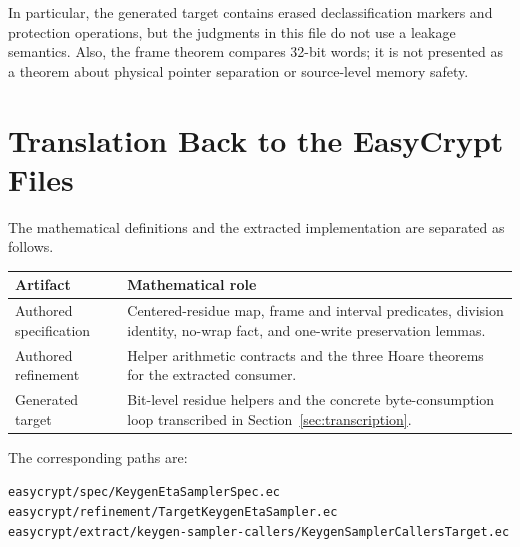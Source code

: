 \documentclass[11pt]{article}
\theoremstyle{definition}
\theoremstyle{plain}
\theoremstyle{remark}
\newcommand{\code}[1]{\nolinkurl{#1}}
\begin{document}
In particular, the generated target contains erased declassification markers
and protection operations, but the judgments in this file do not use a
leakage semantics.  Also, the frame theorem compares 32-bit words; it is not
presented as a theorem about physical pointer separation or source-level
memory safety.

\section{Translation Back to the EasyCrypt Files}

The mathematical definitions and the extracted implementation are separated
as follows.

\noindent\begin{tabularx}{\textwidth}{>{\raggedright\arraybackslash}p{}X}
\toprule
Artifact & Mathematical role \\
\midrule
Authored specification & Centered-residue map, frame and interval predicates,
division identity, no-wrap fact, and one-write preservation lemmas. \\
Authored refinement & Helper arithmetic contracts and the three Hoare theorems
for the extracted consumer. \\
Generated target & Bit-level residue helpers and the concrete byte-consumption
loop transcribed in Section~\ref{sec:transcription}. \\
\bottomrule
\end{tabularx}

The corresponding paths are:
\begin{center}
\footnotesize
\code{easycrypt/spec/KeygenEtaSamplerSpec.ec}\\
\code{easycrypt/refinement/TargetKeygenEtaSampler.ec}\\
\code{easycrypt/extract/keygen-sampler-callers/KeygenSamplerCallersTarget.ec}
\end{center}
\end{document}
